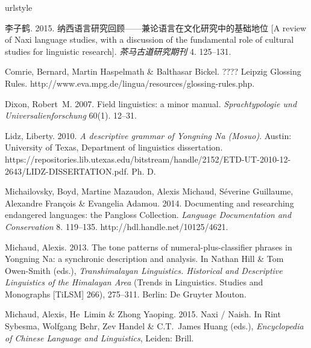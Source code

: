 \begin{thebibliography}{7}
	\providecommand{\natexlab}[1]{#1}
	\providecommand{\url}[1]{#1}
	\providecommand{\urlprefix}{}
	\expandafter\ifx\csname urlstyle\endcsname\relax
	\providecommand{\doi}[1]{doi:\discretionary{}{}{}#1}\else
	\providecommand{\doi}{doi:\discretionary{}{}{}\begingroup
		\urlstyle{rm}\Url}\fi
	
	李子鹤. 2015.
	\newblock
	纳西语言研究回顾------兼论语言在文化研究中的基础地位
	[{A} review of {Naxi} language studies, with a discussion of the fundamental
	role of cultural studies for linguistic research].
	\newblock \emph{茶马古道研究期刊} 4. 125--131.
	
	Comrie, Bernard, Martin Haspelmath \& Balthasar Bickel. ????
	\newblock Leipzig {Glossing Rules}.
	\newblock
	\urlprefix\url{http://www.eva.mpg.de/lingua/resources/glossing-rules.php}.
	
	Dixon, Robert~M. 2007.
	\newblock Field linguistics: a minor manual.
	\newblock \emph{Sprachtypologie und Universalienforschung} 60(1). 12--31.
	
	Lidz, Liberty. 2010.
	\newblock \emph{A descriptive grammar of {Yongning Na} ({Mosuo})}.
	\newblock Austin: University of Texas, Department of linguistics dissertation.
	\newblock
	\urlprefix\url{https://repositories.lib.utexas.edu/bitstream/handle/2152/ETD-UT-2010-12-2643/LIDZ-DISSERTATION.pdf}.
	\newblock Ph. D.
	
	Michailovsky, Boyd, Martine Mazaudon, Alexis Michaud, S{\'{e}}verine Guillaume,
	Alexandre Fran{\c{c}}ois \& Evangelia Adamou. 2014.
	\newblock Documenting and researching endangered languages: the {Pangloss
		Collection}.
	\newblock \emph{Language Documentation and Conservation} 8. 119--135.
	\newblock \urlprefix\url{http://hdl.handle.net/10125/4621}.
	
	Michaud, Alexis. 2013.
	\newblock The tone patterns of numeral-plus-classifier phrases in {Yongning
		Na}: a synchronic description and analysis.
	\newblock In Nathan Hill \& Tom Owen-Smith (eds.), \emph{Transhimalayan
		{Linguistics}. {Historical} and {Descriptive} {Linguistics} of the
		{Himalayan} {Area}} (Trends in {Linguistics}. {Studies} and {Monographs}
	[{TiLSM}] 266), 275--311. Berlin: De Gruyter Mouton.
	
	Michaud, Alexis, He~Limin \& Zhong Yaoping. 2015.
	\newblock Naxi / {Naish}.
	\newblock In Rint Sybesma, Wolfgang Behr, Zev Handel \& C.T.~James Huang
	(eds.), \emph{Encyclopedia of {Chinese} {Language} and {Linguistics}},
	Leiden: Brill.
	
\end{thebibliography}
